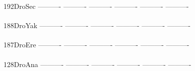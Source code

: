 \documentclass[11pt,twoside,reqno,a4paper]{article}
\begin{document}
{192\hspace*{2\charwidth}DroSec	----------	----------	----------	----------	----------	----------	\\
\hspace*{5\charwidth}\hspace*{7\charwidth}\hspace*{1\charwidth}\hspace*{1\charwidth}\hspace*{1\charwidth}\hspace*{1\charwidth}\hspace*{1\charwidth}\hspace*{1\charwidth}\\
188\hspace*{2\charwidth}DroYak	----------	----------	----------	----------	----------	----------	\\
\hspace*{5\charwidth}\hspace*{7\charwidth}\hspace*{1\charwidth}\hspace*{1\charwidth}\hspace*{1\charwidth}\hspace*{1\charwidth}\hspace*{1\charwidth}\hspace*{1\charwidth}\\
187\hspace*{2\charwidth}DroEre	----------	----------	----------	----------	----------	----------	\\
\hspace*{5\charwidth}\hspace*{7\charwidth}\hspace*{1\charwidth}\hspace*{1\charwidth}\hspace*{1\charwidth}\hspace*{1\charwidth}\hspace*{1\charwidth}\hspace*{1\charwidth}\\
128\hspace*{2\charwidth}DroAna	----------	----------	----------	----------	----------	----------	\\
\hspace*{5\charwidth}\hspace*{7\charwidth}\hspace*{1\charwidth}\hspace*{1\charwidth}\hspace*{1\charwidth}\hspace*{1\charwidth}\hspace*{1\charwidth}\hspace*{1\charwidth}\\
}
\end{document}
